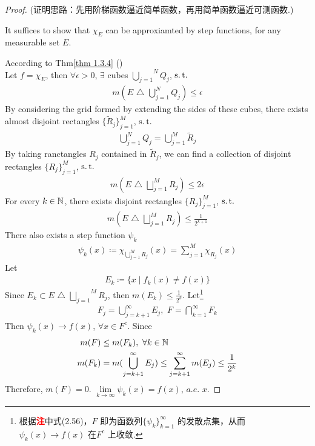 \begin{thm}
		\vspace{2em}
		\begin{proof}
			(证明思路：先用阶梯函数逼近简单函数，再用简单函数逼近可测函数.)
			\begin{center}
				It suffices to show that $\chi_E$ can be approxiamted by step functions, for any measurable set $E$.
			\end{center}
			According to Thm\ref{thm 1.3.4} () \\
			Let $f = \chi_E$, then $\forall \epsilon > 0$, $\exists$ cubes $\overset{N}{\underset{j = 1}{\bigcup}}{Q_j}$, $\operatorname{s.t.}$
			\begin{align}
				m(E \,\, \triangle \,\, \bigcup_{j = 1}^{N}{Q_j}) \leq \epsilon
			\end{align}
			By considering the grid formed by extending the sides of these cubes, there exists almost disjoint rectangles $\{ \widetilde{R}_j \}_{j = 1}^{M}$, $\operatorname{s.t.}$
			\begin{align}
				\bigcup_{j = 1}^{N}{Q_j} = \bigcup_{j = 1}^{M}{\widetilde{R}_j}
			\end{align}
			By taking ranctangles $R_j$ contained in $\widetilde{R}_j$, we can find a collection of disjoint rectangles $\{ R_j \}_{j = 1}^{M}$, $\operatorname{s.t.}$
			\begin{align}
				m(E \,\, \triangle \,\, \bigsqcup_{j = 1}^{M}{R_j}) \leq 2\epsilon
			\end{align}
			For every $k \in \mathbb{N}$, there exists disjoint rectangles $\{ R_j \}_{j = 1}^{M}$, $\operatorname{s.t.}$
			\begin{align}
				m(E \,\, \triangle \,\, \bigsqcup_{j = 1}^{M}{R_j}) \leq \frac{1}{2^{k + 1}}
			\end{align}
			There also exists a step function $\psi_k$
			\begin{align}
				\psi_{k}(x) \coloneqq \chi_{\bigcup_{j = 1}^{M}{R_j}}(x) = \sum_{j = 1}^{M}{\chi_{R_j}(x)}
			\end{align}
			Let
			\begin{align}
				E_k \coloneqq \{ x \mid f_{k}(x) \neq f(x) \}
			\end{align}
			Since $E_k \subset E \,\, \triangle \,\, \overset{M}{\underset{j = 1}{\bigsqcup}}{R_j}$, then $m(E_k) \leq \frac{1}{2^k}$. Let\footnote{根据\textcolor{red}{\textbf{注}}中式(2.56)，$F$ 即为函数列$\{ \psi_k \}_{k = 1}^{\infty}$ 的发散点集，从而$\psi_{k}(x) \to f(x)$ 在$F^c$ 上收敛.}
			\begin{align}
				F_j = \bigcup_{j = k + 1}^{\infty}{E_j} , \,\, F = \bigcap_{k = 1}^{\infty}{F_k}
			\end{align}
			Then $\psi_{k}(x) \to f(x)$, $\forall x \in F^c$. Since
			\begin{align}
				m(F) &\leq m(F_k) , \,\, \forall k \in \mathbb{N} \\
				m(F_k) &= m(\bigcup_{j = k + 1}^{\infty}{E_j}) \leq \sum_{j = k + 1}^{\infty}{m(E_j)} \leq \frac{1}{2^k}
			\end{align}
			Therefore, $m(F) = 0$. $\underset{k \to \infty}{\lim}{\psi_{k}(x)} = f(x)$, $a.e.$ $x$.
		\end{proof}
	\end{thm}

